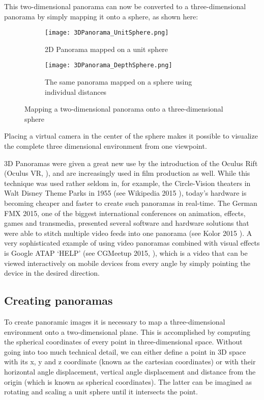 This two-dimensional panorama can now be converted to a three-dimensional panorama by simply mapping it onto a sphere, as shown here:


\begin{figure}[h]
	\centering
	\begin{subfigure}[b]{0.45\textwidth}
		\centering
		\texttt{[image: 3DPanorama\_UnitSphere.png]}
		\caption{2D Panorama mapped on a unit sphere}
		\label{fig:3d_panorama_unit_sphere}
	\end{subfigure}
	\hfill
	\begin{subfigure}[b]{0.45\textwidth}
		\centering
		\texttt{[image: 3DPanorama\_DepthSphere.png]}
		\caption{The same panorama mapped on a sphere using individual distances}
		\label{fig:3d_panorama_depth_sphere}
	\end{subfigure}

	\caption{Mapping a two-dimensional panorama onto a three-dimensional sphere}
	\label{fig:3d_panorama}
\end{figure}

Placing a virtual camera in the center of the sphere makes it possible to visualize the complete three dimensional environment from one viewpoint.

3D Panoramas were given a great new use by the introduction of the Oculus Rift  (Oculus VR, \parencite{OculusVR}), and are increasingly used in film production as well. While this technique was used rather seldom in, for example, the Circle-Vision theaters in Walt Disney Theme Parks in 1955 (see Wikipedia 2015 \parencite{wiki:CircleVision}), today's hardware is becoming cheaper and faster to create such panoramas in real-time. The German FMX 2015, one of the biggest international conferences on animation, effects, games and transmedia, presented several software and hardware solutions that were able to stitch multiple video feeds into one panorama (see Kolor 2015 \parencite{kolorGoPro}). A very sophisticated example of using video panoramas combined with visual effects is Google ATAP ‘HELP’ (see CGMeetup 2015, \parencite{googleATAPHelp}), which is a video that can be viewed interactively on mobile devices from every angle by simply pointing the device in the desired direction.

\subsection{Creating panoramas} \label{section_creating_panoramas}

To create panoramic images it is necessary to map a three-dimensional environment onto a two-dimensional plane. This is accomplished by computing the spherical coordinates of every point in three-dimensional space. Without going into too much technical detail, we can either define a point in 3D space with its x, y and z coordinate (known as the cartesian coordinates) or with their horizontal angle displacement, vertical angle displacement and distance from the origin (which is known as spherical coordinates). The latter can be imagined as rotating and scaling a unit sphere until it intersects the point.

